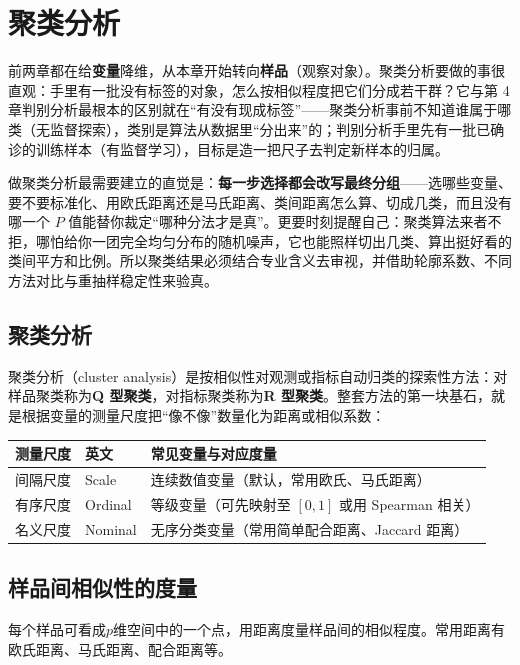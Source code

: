 \chapter{聚类分析}
前两章都在给\textbf{变量}降维，从本章开始转向\textbf{样品}（观察对象）。聚类分析要做的事很直观：手里有一批没有标签的对象，怎么按相似程度把它们分成若干群？它与第 4 章判别分析最根本的区别就在“有没有现成标签”——聚类分析事前不知道谁属于哪类（无监督探索），类别是算法从数据里“分出来”的；判别分析手里先有一批已确诊的训练样本（有监督学习），目标是造一把尺子去判定新样本的归属。

做聚类分析最需要建立的直觉是：\textbf{每一步选择都会改写最终分组}——选哪些变量、要不要标准化、用欧氏距离还是马氏距离、类间距离怎么算、切成几类，而且没有哪一个 $P$ 值能替你裁定“哪种分法才是真”。更要时刻提醒自己：聚类算法来者不拒，哪怕给你一团完全均匀分布的随机噪声，它也能照样切出几类、算出挺好看的类间平方和比例。所以聚类结果必须结合专业含义去审视，并借助轮廓系数、不同方法对比与重抽样稳定性来验真。
\section{聚类分析}
聚类分析（cluster analysis）是按相似性对观测或指标自动归类的探索性方法：对样品聚类称为\textbf{Q 型聚类}，对指标聚类称为\textbf{R 型聚类}。整套方法的第一块基石，就是根据变量的测量尺度把“像不像”数量化为距离或相似系数：
\begin{center}\begin{tabular}{lll}\toprule
{\bfseries 测量尺度}&{\bfseries 英文}&{\bfseries 常见变量与对应度量}\\\midrule
间隔尺度&Scale&连续数值变量（默认，常用欧氏、马氏距离）\\
有序尺度&Ordinal&等级变量（可先映射至 $[0,1]$ 或用 Spearman 相关）\\
名义尺度&Nominal&无序分类变量（常用简单配合距离、Jaccard 距离）\\\bottomrule
\end{tabular}\end{center}
\section{样品间相似性的度量}
每个样品可看成$p$维空间中的一个点，用距离度量样品间的相似程度。常用距离有欧氏距离、马氏距离、配合距离等。
